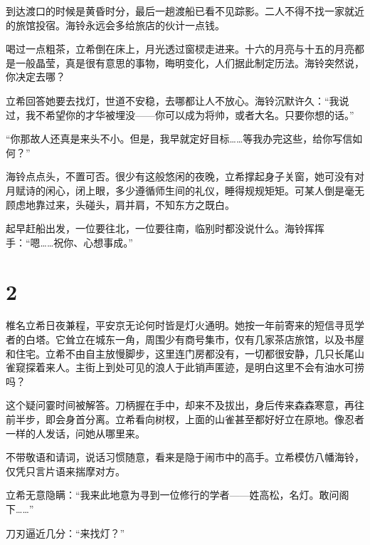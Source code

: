 \documentclass{article}
\begin{document}
到达渡口的时候是黄昏时分，最后一趟渡船已看不见踪影。二人不得不找一家就近的旅馆投宿。海铃永远会多给旅店的伙计一点钱。



喝过一点粗茶，立希倒在床上，月光透过窗棂走进来。十六的月亮与十五的月亮都是一般晶莹，真是很有意思的事物，晦明变化，人们据此制定历法。海铃突然说，你决定去哪？



立希回答她要去找灯，世道不安稳，去哪都让人不放心。海铃沉默许久：“我说过，我不希望你的才华被埋没——你可以成为将帅，或者大名。只要你想的话。”



“你那故人还真是来头不小。但是，我早就定好目标……等我办完这些，给你写信如何？”



海铃点点头，不置可否。很少有这般悠闲的夜晚，立希撑起身子关窗，她可没有对月赋诗的闲心，闭上眼，多少遵循师生间的礼仪，睡得规规矩矩。可某人倒是毫无顾虑地靠过来，头碰头，肩并肩，不知东方之既白。



起早赶船出发，一位要往北，一位要往南，临别时都没说什么。海铃挥挥手：“嗯……祝你、心想事成。”





{\centering\section*{2}}





椎名立希日夜兼程，平安京无论何时皆是灯火通明。她按一年前寄来的短信寻觅学者的白塔。它耸立在城东一角，周围少有商号集市，仅有几家茶店旅馆，以及书屋和住宅。立希不由自主放慢脚步，这里连门房都没有，一切都很安静，几只长尾山雀窥探着来人。主街上到处可见的浪人于此销声匿迹，是明白这里不会有油水可捞吗？



这个疑问霎时间被解答。刀柄握在手中，却来不及拔出，身后传来森森寒意，再往前半步，即会身首分离。立希看向树杈，上面的山雀甚至都好好立在原地。像忍者一样的人发话，问她从哪里来。



不带敬语和请词，说话习惯随意，看来是隐于闹市中的高手。立希模仿八幡海铃，仅凭只言片语来揣摩对方。



立希无意隐瞒：“我来此地意为寻到一位修行的学者——姓高松，名灯。敢问阁下……”



刀刃逼近几分：“来找灯？”
\end{document}
